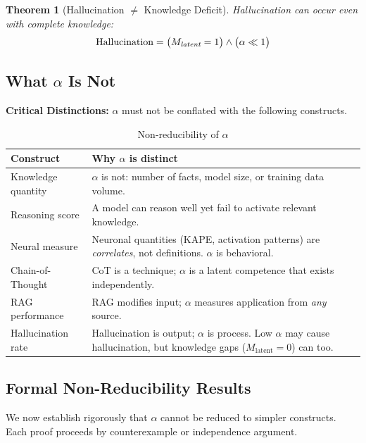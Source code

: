\documentclass[11pt,a4paper]{article}
\newtheorem{theorem}{Theorem}[section]
\begin{document}
\begin{theorem}[Hallucination $\neq$ Knowledge Deficit]
Hallucination can occur even with complete knowledge:
\begin{equation}
\text{Hallucination} = \big( M_{\emph{latent}} = 1 \big) \land \big( \alpha \ll 1 \big)
\end{equation}
\end{theorem}


\subsection{What $\alpha$ Is Not}

\begin{assumptionbox}
\textbf{Critical Distinctions:} $\alpha$ must not be conflated with the following constructs.
\end{assumptionbox}

\begin{table}[H]
\centering
\caption{Non-reducibility of $\alpha$}
\begin{tabular}{lp{9cm}}
\toprule
\textbf{Construct} & \textbf{Why $\alpha$ is distinct} \\
\midrule
Knowledge quantity & $\alpha$ is not: number of facts, model size, or training data volume. \\[0.3em]
Reasoning score & A model can reason well yet fail to activate relevant knowledge. \\[0.3em]
Neural measure & Neuronal quantities (KAPE, activation patterns) are \emph{correlates}, not definitions. $\alpha$ is behavioral. \\[0.3em]
Chain-of-Thought & CoT is a technique; $\alpha$ is a latent competence that exists independently. \\[0.3em]
RAG performance & RAG modifies input; $\alpha$ measures application from \emph{any} source. \\[0.3em]
Hallucination rate & Hallucination is output; $\alpha$ is process. Low $\alpha$ may cause hallucination, but knowledge gaps ($M_{\text{latent}} = 0$) can too. \\
\bottomrule
\end{tabular}
\end{table}


\subsection{Formal Non-Reducibility Results}

We now establish rigorously that $\alpha$ cannot be reduced to simpler constructs. Each proof proceeds by counterexample or independence argument.
\end{document}
